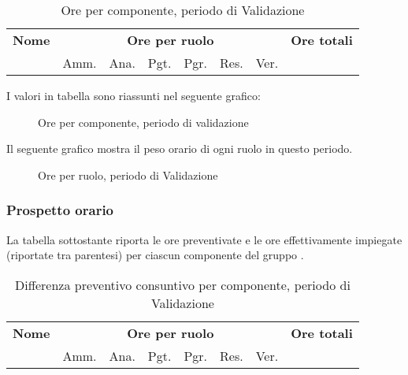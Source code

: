 	\begin{table}[H]
	\centering
	\begin{tabular}{lccccccc}
	\toprule 
	    \textbf{Nome}  & \multicolumn{6}{c}{\textbf{Ore per ruolo}} & \textbf{Ore totali}\\
	    & Amm. & Ana. & Pgt. & Pgr. & Res. & Ver. \\
	    \midrule
	    
	    \bottomrule
	\end{tabular}
	\caption{Ore per componente, periodo di Validazione}
	\end{table}

	I valori in tabella sono riassunti nel seguente grafico: \\ 

	\begin{figure}[H]
	\caption{Ore per componente, periodo di validazione}
	\end{figure}

	Il seguente grafico mostra il peso orario di ogni ruolo in questo periodo.

	\begin{figure}[H]
	\begin{tikzpicture}
		
	\end{tikzpicture}\caption{Ore per ruolo, periodo di Validazione}
	\end{figure}

	\subsubsection{Prospetto orario}

	La tabella sottostante riporta le ore preventivate e le ore effettivamente impiegate (riportate tra parentesi) per ciascun componente del gruppo \GroupName{}.

	\begin{center}
	\begin{table}[H]
	\begin{tabular}{lccccccc}
	\toprule
	    \textbf{Nome}  & \multicolumn{6}{c}{\textbf{Ore per ruolo}} & \textbf{Ore totali} \\
	     & Amm. & Ana. & Pgt. & Pgr. & Res. & Ver. & \\
	    \midrule
	    
	    \bottomrule
	\end{tabular}
	\caption{Differenza preventivo consuntivo per componente, periodo di Validazione}
	\end{table}
	\end{center}


